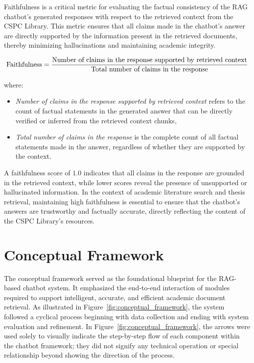 \begin{refsection}
Faithfulness is a critical metric for evaluating the factual consistency of the RAG chatbot's generated responses with respect to the retrieved context from the CSPC Library. This metric ensures that all claims made in the chatbot's answer are directly supported by the information present in the retrieved documents, thereby minimizing hallucinations and maintaining academic integrity.

\begin{equation}
\centering
\text{Faithfulness} = \frac{\text{Number of claims in the response supported by retrieved context}}{\text{Total number of claims in the response}}
\end{equation}

where:
\begin{itemize}
\item \textit{Number of claims in the response supported by retrieved context} refers to the count of factual statements in the generated answer that can be directly verified or inferred from the retrieved context chunks,
\item \textit{Total number of claims in the response} is the complete count of all factual statements made in the answer, regardless of whether they are supported by the context.
\end{itemize}

A faithfulness score of $1.0$ indicates that all claims in the response are grounded in the retrieved context, while lower scores reveal the presence of unsupported or hallucinated information. In the context of academic literature search and thesis retrieval, maintaining high faithfulness is essential to ensure that the chatbot's answers are trustworthy and factually accurate, directly reflecting the content of the CSPC Library's resources.


\section{Conceptual Framework}

The conceptual framework served as the foundational blueprint for the RAG-based chatbot system. It emphasized the end-to-end interaction of modules required to support intelligent, accurate, and efficient academic document retrieval. As illustrated in Figure~\ref{fig:conceptual_framework}, the system followed a cyclical process beginning with data collection and ending with system evaluation and refinement.
In Figure~\ref{fig:conceptual_framework}, the arrows were used solely to visually indicate the step-by-step flow of each component within the chatbot framework; they did not signify any technical operation or special relationship beyond showing the direction of the process. 


\end{refsection}
